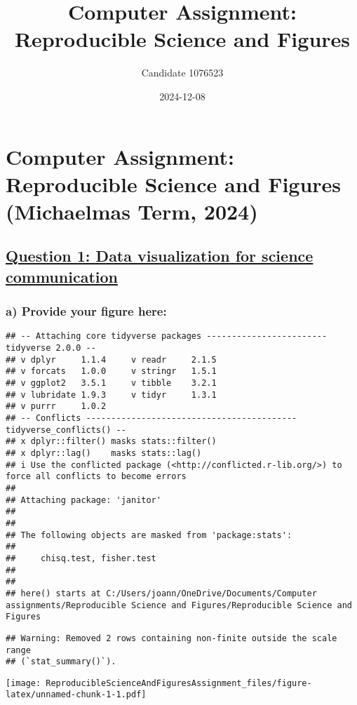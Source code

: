 \documentclass[
]{article}
\title{Computer Assignment: Reproducible Science and Figures}
\author{Candidate 1076523}
\date{2024-12-08}
\begin{document}
\maketitle

\section{Computer Assignment: Reproducible Science and Figures
(Michaelmas Term,
2024)}\label{computer-assignment-reproducible-science-and-figures-michaelmas-term-2024}

\subsection{\texorpdfstring{\ul{Question 1: Data visualization for
science
communication}}{Question 1: Data visualization for science communication}}\label{question-1-data-visualization-for-science-communication}

\subsubsection{a) Provide your figure
here:}\label{a-provide-your-figure-here}

\begin{verbatim}
## -- Attaching core tidyverse packages ------------------------ tidyverse 2.0.0 --
## v dplyr     1.1.4     v readr     2.1.5
## v forcats   1.0.0     v stringr   1.5.1
## v ggplot2   3.5.1     v tibble    3.2.1
## v lubridate 1.9.3     v tidyr     1.3.1
## v purrr     1.0.2     
## -- Conflicts ------------------------------------------ tidyverse_conflicts() --
## x dplyr::filter() masks stats::filter()
## x dplyr::lag()    masks stats::lag()
## i Use the conflicted package (<http://conflicted.r-lib.org/>) to force all conflicts to become errors
## 
## Attaching package: 'janitor'
## 
## 
## The following objects are masked from 'package:stats':
## 
##     chisq.test, fisher.test
## 
## 
## here() starts at C:/Users/joann/OneDrive/Documents/Computer assignments/Reproducible Science and Figures/Reproducible Science and Figures
\end{verbatim}

\begin{verbatim}
## Warning: Removed 2 rows containing non-finite outside the scale range
## (`stat_summary()`).
\end{verbatim}

\texttt{[image: ReproducibleScienceAndFiguresAssignment\_files/figure-latex/unnamed-chunk-1-1.pdf]}
\end{document}
